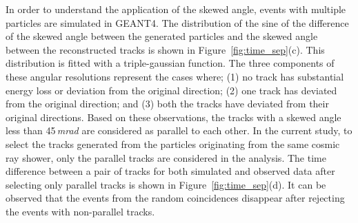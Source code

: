 \documentclass[a4paper,12pt,twoside,openany]{article}
\begin{document}
In order to understand the application of the skewed angle, events with multiple particles are simulated in GEANT4. The distribution of the sine of the difference of the skewed angle between the generated particles and the skewed angle between the reconstructed tracks is shown in Figure~\ref{fig:time_sep}(c). This distribution is fitted with a triple-gaussian function. The three components of these angular resolutions represent the cases where; (1) no track has substantial energy loss or deviation from the original direction; (2) one track has deviated from the original direction; and (3) both the tracks have deviated from their original directions. Based on these observations, the tracks with a skewed angle less than 45\,\textit{mrad} are considered as parallel to each other. In the current study, to select the tracks generated from the particles originating from the same cosmic ray shower, only the parallel tracks are considered in the analysis. The time difference between a pair of tracks for both simulated and observed data after selecting only parallel tracks is shown in Figure~\ref{fig:time_sep}(d). It can be observed that the events from the random coincidences disappear after rejecting the events with non-parallel tracks.
\end{document}
